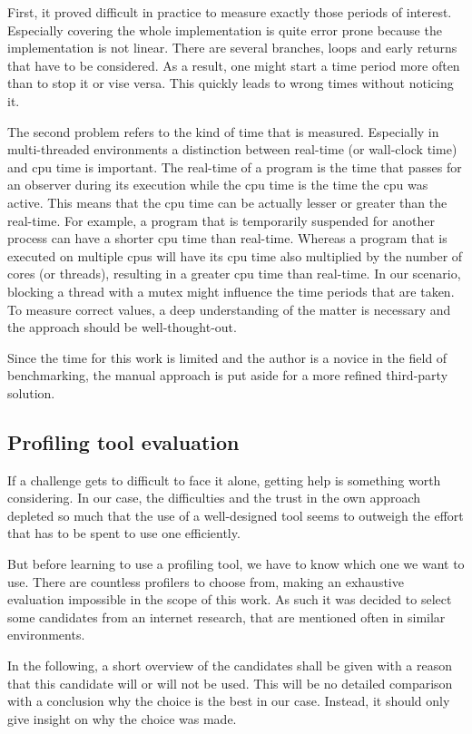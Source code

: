 First, it proved difficult in practice to measure exactly those periods of interest. Especially covering the whole implementation is quite error prone because the implementation is not linear. There are several branches, loops and early returns that have to be considered. As a result, one might start a time period more often than to stop it or vise versa. This quickly leads to wrong times without noticing it.

The second problem refers to the kind of time that is measured. Especially in multi-threaded environments a distinction between real-time (or wall-clock time) and cpu time is important. The real-time of a program is the time that passes for an observer during its execution while the cpu time is the time the cpu was active. This means that the cpu time can be actually lesser or greater than the real-time. For example, a program that is temporarily suspended for another process can have a shorter cpu time than real-time. Whereas a program that is executed on multiple cpus will have its cpu time also multiplied by the number of cores (or threads), resulting in a greater cpu time than real-time. In our scenario, blocking a thread with a mutex might influence the time periods that are taken. To measure correct values, a deep understanding of the matter is necessary and the approach should be well-thought-out.

Since the time for this work is limited and the author is a novice in the field of benchmarking, the manual approach is put aside for a more refined third-party solution.

\subsection{Profiling tool evaluation}
If a challenge gets to difficult to face it alone, getting help is something worth considering. In our case, the difficulties and the trust in the own approach depleted so much that the use of a well-designed tool seems to outweigh the effort that has to be spent to use one efficiently.

But before learning to use a profiling tool, we have to know which one we want to use. There are countless profilers to choose from, making an exhaustive evaluation impossible in the scope of this work. As such it was decided to select some candidates from an internet research, that are mentioned often in similar environments.

In the following, a short overview of the candidates shall be given with a reason that this candidate will or will not be used. This will be no detailed comparison with a conclusion why the choice is the best in our case. Instead, it should only give insight on why the choice was made.

